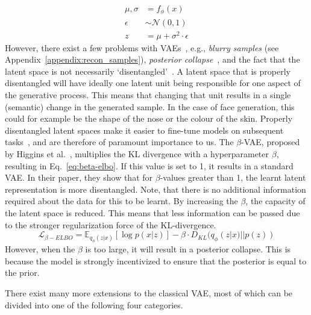 \begin{equation}
    \begin{split}
        \mu, \sigma & = f_\phi(x)                     \\
        \epsilon    & \sim \mathcal{N}(0, 1)          \\
        z           & = \mu + \sigma^2 \cdot \epsilon
    \end{split}
    \label{eq:reparametrization-trick}
\end{equation}
However, there exist a few problems with VAEs~\cite{tomczak2021deep}, e.g., \emph{blurry samples} (see Appendix~\ref{appendix:recon_samples}), \emph{posterior collapse}~\cite{DBLP:journals/corr/BowmanVVDJB15}, and the fact that the latent space is not necessarily `disentangled'~\cite{higgins2017betavae}. A latent space that is properly disentangled will have ideally one latent unit being responsible for one aspect of the generative process. This means that changing that unit results in a single (semantic) change in the generated sample. In the case of face generation, this could for example be the shape of the nose or the colour of the skin. Properly disentangled latent spaces make it easier to fine-tune models on subsequent tasks~\cite{bengio2014representationlearningreviewnew}, and are therefore of paramount importance to us. The $\beta$-VAE, proposed by Higgins et al.~\cite{higgins2017betavae}, multiplies the KL divergence with a hyperparameter $\beta$, resulting in Eq.~\ref{eq:beta-elbo}. If this value is set to 1, it results in a standard VAE. In their paper, they show that for $\beta$-values greater than 1, the learnt latent representation is more disentangled. Note, that there is no additional information required about the data for this to be learnt. By increasing the $\beta$, the capacity of the latent space is reduced. This means that less information can be passed due to the stronger regularization force of the KL-divergence.
\begin{equation}
    \mathcal{L}_{\beta-ELBO} = \mathbb{E}_{q_{\phi}(z|x)}[\log p(x|z)] - \beta \cdot D_{KL}(q_{\phi}(z|x) || p(z))
    \label{eq:beta-elbo}
\end{equation}
However, when the $\beta$ is too large, it will result in a posterior collapse. This is because the model is strongly incentivized to ensure that the posterior is equal to the prior.

There exist many more extensions to the classical VAE, most of which can be divided into one of the following four categories.

